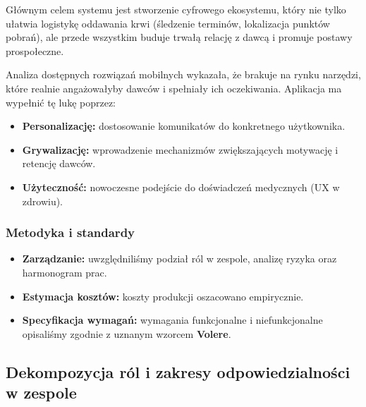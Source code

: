 \documentclass[11pt, a4paper]{article}
\begin{document}
Głównym celem systemu jest stworzenie cyfrowego ekosystemu, który nie tylko ułatwia
logistykę oddawania krwi (śledzenie terminów, lokalizacja punktów pobrań), ale przede
wszystkim buduje trwałą relację z dawcą i promuje postawy prospołeczne.

Analiza dostępnych rozwiązań mobilnych wykazała, że brakuje na rynku narzędzi, które
realnie angażowałyby dawców i spełniały ich oczekiwania.
Aplikacja ma wypełnić tę lukę poprzez:

\begin{itemize}
  \item \textbf{Personalizację:} dostosowanie komunikatów do konkretnego użytkownika.
  \item \textbf{Grywalizację:} wprowadzenie mechanizmów zwiększających motywację i retencję dawców.
  \item \textbf{Użyteczność:} nowoczesne podejście do doświadczeń medycznych (UX w zdrowiu).
\end{itemize}

\subsubsection*{Metodyka i standardy}

\begin{itemize}
  \item \textbf{Zarządzanie:} uwzględniliśmy podział ról w zespole, analizę ryzyka oraz harmonogram prac.
  \item \textbf{Estymacja kosztów:} koszty produkcji oszacowano empirycznie.
  \item \textbf{Specyfikacja wymagań:} wymagania funkcjonalne i niefunkcjonalne opisaliśmy zgodnie
        z uznanym wzorcem \textbf{Volere}.
\end{itemize}

\subsection{Dekompozycja ról i zakresy odpowiedzialności w zespole}
\end{document}
